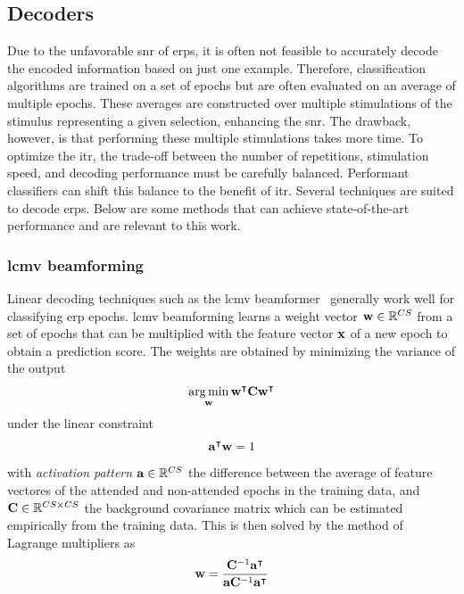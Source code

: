 \subsection{Decoders}

Due to the unfavorable \ac{snr} of \acp{erp}, it is often not feasible to accurately
decode the encoded information based on just one example.
Therefore, classification algorithms are trained on a set of epochs but are often
evaluated on an average of multiple epochs.
These averages are constructed over multiple stimulations of the stimulus representing
a given selection, enhancing the \ac{snr}.
The drawback, however, is that performing these multiple stimulations takes more time.
To optimize the \ac{itr}, the trade-off between the number of repetitions, stimulation
speed, and decoding performance must be carefully balanced.
Performant classifiers can shift this balance to the benefit of \ac{itr}.
Several techniques are suited to decode \acp{erp}.
Below are some methods that can achieve state-of-the-art performance and are relevant to
this work.

\subsubsection{\Acf{lcmv} beamforming}

Linear decoding techniques such as the \ac{lcmv} beamformer~\cite{Wittevrongel2016}
generally work well for classifying \ac{erp} epochs.
\Ac{lcmv} beamforming learns a weight vector $\mathbf{w}\in\mathbb{R}^{CS}$ from
a set of epochs that can be multiplied with the feature vector $\mathbf{x}$ of a
new epoch to obtain a prediction score.
The weights are obtained by minimizing the variance of the output
\begin{equation}
  \operatorname*{arg\,min}_{\mathbf{w}}\mathbf{w}^\intercal\mathbf{C}
	\mathbf{w}^\intercal
\end{equation}
under the linear constraint
\begin{equation}
	\mathbf{a}^\intercal\mathbf{w} = 1
\end{equation}
with \emph{activation pattern} $\mathbf{a}\in\mathbb{R}^{CS}$ the difference between the
average of feature vectores of the attended and non-attended epochs in the
training data,
and $\mathbf{C}\in\mathbb{R}^{CS\times CS}$ the background covariance matrix which
can be estimated empirically from the training data.
This is then solved by the method of Lagrange multipliers as
\begin{equation}
	\mathbf{w} =
  \frac{\mathbf{C}^{-1}\mathbf{a}^\intercal}
  {\mathbf{a}\mathbf{C}^{-1}\mathbf{a}^\intercal}
\end{equation}

